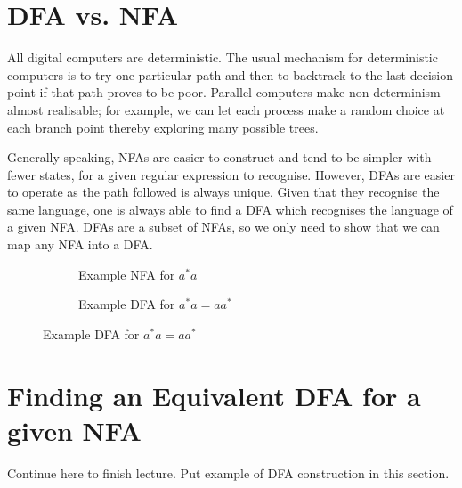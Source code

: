 \section{DFA vs. NFA}
All digital computers are deterministic. The usual mechanism for deterministic computers is to try one particular path and then to backtrack to the last decision point if that path proves to be poor. Parallel computers make non-determinism almost realisable; for example, we can let each process make a random choice at each branch point thereby exploring many possible trees. 



Generally speaking, NFAs are easier to construct and tend to be simpler with fewer states, for a given regular expression to recognise. However, DFAs are easier to operate as the path followed is always unique. Given that they recognise the same language, one is always able to find a DFA which recognises the language of a given NFA. DFAs are a subset of NFAs, so we only need to show that we can map any NFA into a DFA.

\begin{figure}[H]
\begin{minipage}[H]{0.45\textwidth}
\begin{figure}[H]
    \centering
    \caption{Example NFA for $a^*a$}
    \label{fig:nfa-fordfavsnfa}
\end{figure}
\end{minipage}\hfill
\begin{minipage}[H]{0.45\textwidth}
\begin{figure}[H]
    \centering
    \caption{Example DFA for $a^*a = aa^*$}
    \label{fig:dfa-fordfavsnfa}
\end{figure}
\end{minipage}    
\end{figure}

\section{Finding an Equivalent DFA for a given NFA}

\begin{todo}
    Continue here to finish lecture. Put example of DFA construction in this section.
\end{todo}